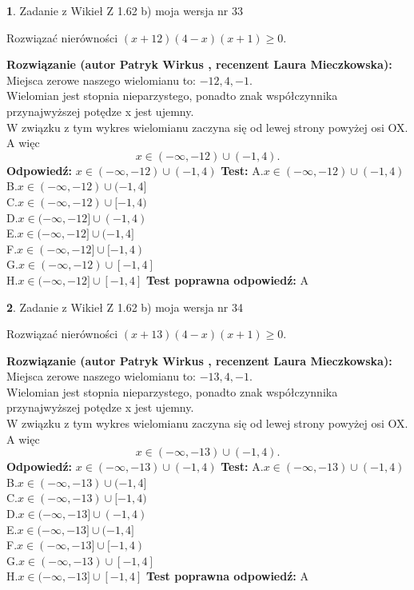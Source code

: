 \documentclass[12pt, a4paper]{article}
\theoremstyle{definition} %
\newtheorem{zad}{}
\newcommand{\zadStart}[1]{\begin{zad}#1\newline}
\newcommand{\zadStop}{\end{zad}}
\newcommand{\rozwStart}[2]{\noindent \textbf{Rozwiązanie (autor #1 , recenzent #2): }\newline}
\newcommand{\rozwStop}{\newline}
\newcommand{\odpStart}{\noindent \textbf{Odpowiedź:}\newline}
\newcommand{\odpStop}{\newline}
\newcommand{\testStart}{\noindent \textbf{Test:}\newline}
\newcommand{\testStop}{\newline}
\newcommand{\kluczStart}{\noindent \textbf{Test poprawna odpowiedź:}\newline}
\newcommand{\kluczStop}{\newline}
\begin{document}
\zadStart{Zadanie z Wikieł Z 1.62 b) moja wersja nr 33}

Rozwiązać nierówności $(x+12)(4-x)(x+1)\ge0$.
\zadStop
\rozwStart{Patryk Wirkus}{Laura Mieczkowska}
Miejsca zerowe naszego wielomianu to: $-12, 4, -1$.\\
Wielomian jest stopnia nieparzystego, ponadto znak współczynnika przy\linebreak najwyższej potędze x jest ujemny.\\ W związku z tym wykres wielomianu zaczyna się od lewej strony powyżej osi OX. A więc $$x \in (-\infty,-12) \cup (-1,4).$$
\rozwStop
\odpStart
$x \in (-\infty,-12) \cup (-1,4)$
\odpStop
\testStart
A.$x \in (-\infty,-12) \cup (-1,4)$\\
B.$x \in (-\infty,-12) \cup (-1,4]$\\
C.$x \in (-\infty,-12) \cup [-1,4)$\\
D.$x \in (-\infty,-12] \cup (-1,4)$\\
E.$x \in (-\infty,-12] \cup (-1,4]$\\
F.$x \in (-\infty,-12] \cup [-1,4)$\\
G.$x \in (-\infty,-12) \cup [-1,4]$\\
H.$x \in (-\infty,-12] \cup [-1,4]$
\testStop
\kluczStart
A
\kluczStop



\zadStart{Zadanie z Wikieł Z 1.62 b) moja wersja nr 34}

Rozwiązać nierówności $(x+13)(4-x)(x+1)\ge0$.
\zadStop
\rozwStart{Patryk Wirkus}{Laura Mieczkowska}
Miejsca zerowe naszego wielomianu to: $-13, 4, -1$.\\
Wielomian jest stopnia nieparzystego, ponadto znak współczynnika przy\linebreak najwyższej potędze x jest ujemny.\\ W związku z tym wykres wielomianu zaczyna się od lewej strony powyżej osi OX. A więc $$x \in (-\infty,-13) \cup (-1,4).$$
\rozwStop
\odpStart
$x \in (-\infty,-13) \cup (-1,4)$
\odpStop
\testStart
A.$x \in (-\infty,-13) \cup (-1,4)$\\
B.$x \in (-\infty,-13) \cup (-1,4]$\\
C.$x \in (-\infty,-13) \cup [-1,4)$\\
D.$x \in (-\infty,-13] \cup (-1,4)$\\
E.$x \in (-\infty,-13] \cup (-1,4]$\\
F.$x \in (-\infty,-13] \cup [-1,4)$\\
G.$x \in (-\infty,-13) \cup [-1,4]$\\
H.$x \in (-\infty,-13] \cup [-1,4]$
\testStop
\kluczStart
A
\kluczStop
\end{document}

